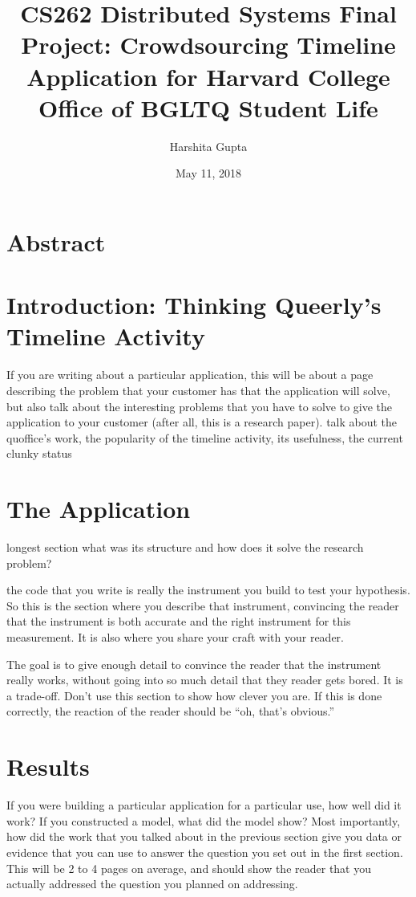\documentclass[12pt] {article}
\begin{document}
\title{CS262 Distributed Systems Final Project: Crowdsourcing Timeline Application for Harvard College Office of BGLTQ Student Life}
\author{Harshita Gupta}
\date{May 11, 2018}
\maketitle
\thispagestyle{empty}
\bigskip
\pagebreak
\setcounter{page}{1}
\section{Abstract}
\section{Introduction: Thinking Queerly's Timeline Activity}
If you are writing about a particular application, this will be about a page describing the problem that your customer has that the application will solve, but also talk about the interesting problems that you have to solve to give the application to your customer (after all, this is a research paper).
talk about the quoffice's work, the popularity of the timeline activity, its usefulness, the current clunky status

\section{The Application}
longest section
what was its structure and how does it solve the research problem?

the code that you write is really the instrument you build to test your hypothesis. So this is the section where you describe that instrument, convincing the reader that the instrument is both accurate and the right instrument for this measurement. It is also where you share your craft with your reader. 

The goal is to give enough detail to convince the reader that the instrument really works, without going into so much detail that they reader gets bored. It is a trade-off. Don’t use this section to show how clever you are. If this is done correctly, the reaction of the reader should be “oh, that’s obvious.”

\section{Results}
If you were building a particular application for a particular use, how well did it work? If you constructed a model, what did the model show? Most importantly, how did the work that you talked about in the previous section give you data or evidence that you can use to answer the question you set out in the first section. This will be 2 to 4 pages on average, and should show the reader that you actually addressed the question you planned on addressing.
\end{document}
